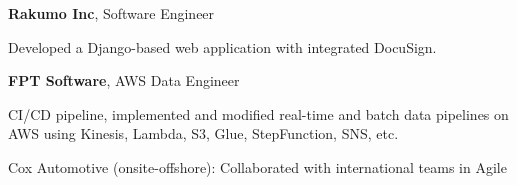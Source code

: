 


\begin{twocolentry}{
	}
	\textbf{Rakumo Inc}, Software Engineer
	\begin{highlights}
		\item Developed a Django-based web application with integrated DocuSign.
	\end{highlights}
\end{twocolentry}

\begin{twocolentry}{
	}
	\textbf{FPT Software}, AWS Data Engineer
	
	\begin{highlights}
		\item CI/CD pipeline, implemented and modified real-time and batch data pipelines on AWS using Kinesis, Lambda, S3, Glue, StepFunction, SNS, etc.
		\item Cox Automotive (onsite-offshore): Collaborated with international teams in Agile
	\end{highlights}
	
	
\end{twocolentry}

